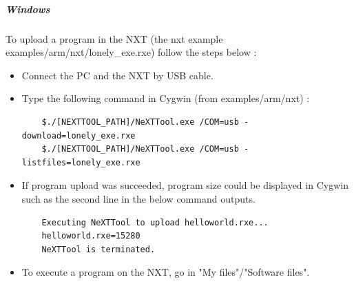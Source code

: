 \subparagraph{Windows}
To upload a program in the NXT (the nxt example examples/arm/nxt/lonely\_exe.rxe) follow the steps below :
\begin{itemize}
\item Connect the PC and the NXT by USB cable.
\item Type the following command in Cygwin (from examples/arm/nxt) :
	\begin{verbatim}
	$./[NEXTTOOL_PATH]/NeXTTool.exe /COM=usb -download=lonely_exe.rxe
	$./[NEXTTOOL_PATH]/NeXTTool.exe /COM=usb -listfiles=lonely_exe.rxe
	\end{verbatim}
\item If program upload was succeeded, program size could be displayed in Cygwin such as the second line in the below command outputs. 
	\begin{verbatim}
	Executing NeXTTool to upload helloworld.rxe...
	helloworld.rxe=15280
	NeXTTool is terminated.
	\end{verbatim}
\item To execute a program on the NXT, go in "My files"/"Software files".
\end{itemize}
